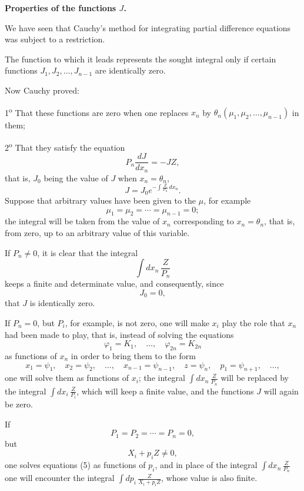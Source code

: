 \documentclass[11pt]{article}
\begin{document}
\begin{center}
\textbf{Properties of the functions $J$.}
\end{center}

We have seen that Cauchy's method for integrating partial difference equations was subject to a restriction.

The function to which it leads represents the sought integral only if certain functions $J_1,J_2,\ldots,J_{n-1}$ are identically zero.

Now Cauchy proved:

1\textsuperscript{o} That these functions are zero when one replaces $x_n$ by $\theta_n(\mu_1,\mu_2,\ldots,\mu_{n-1})$ in them;

2\textsuperscript{o} That they satisfy the equation
\[
P_n\frac{dJ}{dx_n}=-JZ,
\]
that is, $J_0$ being the value of $J$ when $x_n=\theta_n$,
\[
J=J_0e^{-\int \frac{Z}{P_n}\,dx_n}.
\]
Suppose that arbitrary values have been given to the $\mu$, for example
\[
\mu_1=\mu_2=\cdots=\mu_{n-1}=0;
\]
the integral will be taken from the value of $x_n$ corresponding to $x_n=\theta_n$, that is, from zero, up to an arbitrary value of this variable.

If $P_n\ne0$, it is clear that the integral
\[
\int dx_n\,\frac{Z}{P_n}
\]
keeps a finite and determinate value, and consequently, since
\[
J_0=0,
\]
that $J$ is identically zero.

If $P_n=0$, but $P_i$, for example, is not zero, one will make $x_i$ play the role that $x_n$ had been made to play, that is, instead of solving the equations
\begin{equation*}\tag{5}
\varphi_1=K_1,
\quad \ldots,
\quad \varphi_{2n}=K_{2n}
\end{equation*}
as functions of $x_n$ in order to bring them to the form
\begin{equation*}\tag{6}
x_1=\psi_1,
\quad x_2=\psi_2,
\quad \ldots,
\quad x_{n-1}=\psi_{n-1},
\quad z=\psi_n,
\quad p_1=\psi_{n+1},
\quad \ldots,
\end{equation*}
one will solve them as functions of $x_i$; the integral $\displaystyle\int dx_n\,\frac{Z}{P_n}$ will be replaced by the integral $\displaystyle\int dx_i\,\frac{Z}{P_i}$, which will keep a finite value, and the functions $J$ will again be zero.

If
\[
P_1=P_2=\cdots=P_n=0,
\]
but
\[
X_i+p_iZ\ne0,
\]
one solves equations (5) as functions of $p_i$, and in place of the integral $\displaystyle\int dx_n\,\frac{Z}{P_n}$ one will encounter the integral $\displaystyle\int dp_i\,\frac{Z}{X_i+p_iZ}$, whose value is also finite.
\end{document}
